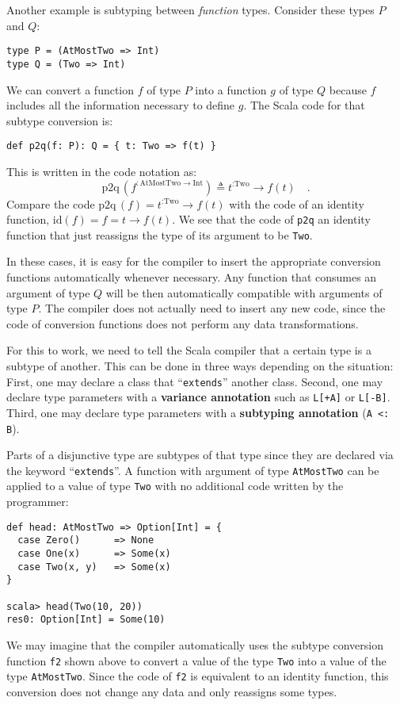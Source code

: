 Another example is  subtyping between \emph{function} types. Consider
these types $P$ and $Q$:
\begin{lstlisting}
type P = (AtMostTwo => Int)
type Q = (Two => Int)
\end{lstlisting}
We can convert a function $f$ of type $P$ into a function $g$ of
type $Q$ because $f$ includes all the information necessary to define
$g$. The Scala code for that subtype conversion is:
\begin{lstlisting}
def p2q(f: P): Q = { t: Two => f(t) }
\end{lstlisting}
This is written in the code notation as:
\[
\text{p2q}\,(f^{:\text{AtMostTwo}\rightarrow\text{Int}})\triangleq t^{:\text{Two}}\rightarrow f(t)\quad.
\]
Compare the code $\text{p2q}\,(f)=t^{:\text{Two}}\rightarrow f(t)$
with the code of an identity function, $\text{id}\left(f\right)=f=t\rightarrow f(t)$.
We see that the code of \lstinline!p2q! an identity function that
just reassigns the type of its argument to be \lstinline!Two!.

In these cases, it is easy for the compiler to insert the appropriate
conversion functions automatically whenever necessary. Any function
that consumes an argument of type $Q$ will be then automatically
compatible with arguments of type $P$. The compiler does not actually
need to insert any new code, since the code of conversion functions
does not perform any data transformations.

For this to work, we need to tell the Scala compiler that a certain
type is a subtype of another. This can be done in three ways depending
on the situation: First, one may declare a class that \textsf{``}\lstinline!extends!\textsf{''}
another class. Second, one may declare type parameters with a \textbf{variance
annotation} such as \lstinline!L[+A]! or \lstinline!L[-B]!. Third,
one may declare type parameters with a \textbf{subtyping annotation}
(\lstinline!A <: B!).

Parts of a disjunctive type are subtypes of that type since they are
declared via the keyword \textsf{``}\lstinline!extends!\textsf{''}. A
function with argument of type \lstinline!AtMostTwo! can be applied
to a value of type \lstinline!Two! with no additional code written
by the programmer:
\begin{lstlisting}
def head: AtMostTwo => Option[Int] = {
  case Zero()      => None
  case One(x)      => Some(x)
  case Two(x, y)   => Some(x)
}

scala> head(Two(10, 20))
res0: Option[Int] = Some(10)
\end{lstlisting}
We may imagine that the compiler automatically uses the subtype conversion
function \lstinline!f2! shown above to convert a value of the type
\lstinline!Two! into a value of the type \lstinline!AtMostTwo!.
Since the code of \lstinline!f2! is equivalent to an identity function,
this conversion does not change any data and only reassigns some types. 


